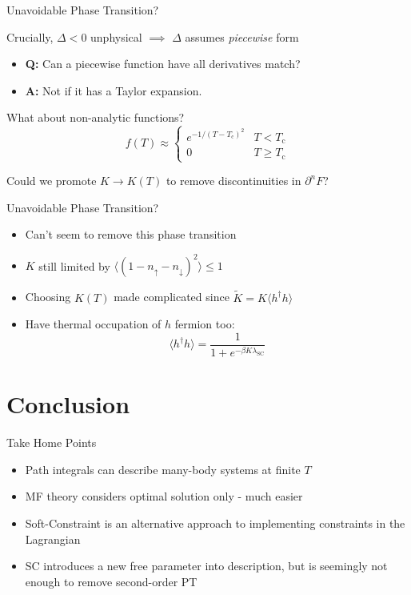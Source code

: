 \documentclass[13pt]{beamer}
\begin{document}
  \begin{frame}{Unavoidable Phase Transition?}

  Crucially, $ \Delta < 0 $ unphysical $ \implies $ $ \Delta $ assumes \emph{piecewise} form

    \begin{itemize}
      \item \textbf{Q:} Can a piecewise function have all derivatives match?
      \item \textbf{A:} Not if it has a Taylor expansion.
    \end{itemize}

  \begin{exampleblock}{What about non-analytic functions?}
    $$ f(T) \approx 
    \begin{cases}
    e^{- 1 / (T - T_{\text{c}})^2} & T < T_{\text{c}} \\
    0 & T \geq T_{\text{c}}
    \end{cases} $$
  \end{exampleblock}

  Could we promote $ K \rightarrow K(T) $ to remove discontinuities in $ \partial^n F $?

  \end{frame}

  \begin{frame}{Unavoidable Phase Transition?}
    \begin{itemize}
      \item Can't seem to remove this phase transition
      \item $ K $ still limited by $ \langle (1 - n_{\uparrow} - n_{\downarrow})^2 \rangle \leq 1 $
      \item Choosing $ K(T) $ made complicated since $ \widetilde{K} = K \langle h^{\dagger} h \rangle $
      \item Have thermal occupation of $ h $ fermion too: $$ \langle h^{\dagger} h \rangle = \frac{1}{1 + e^{- \beta K \lambda_{\text{SC}}}} $$
    \end{itemize}

  \end{frame}

  \section{Conclusion}

  \begin{frame}{Take Home Points}

  \begin{itemize}
    \item Path integrals can describe many-body systems at finite $ T $
    \item MF theory considers optimal solution only - much easier
    \item Soft-Constraint is an alternative approach to implementing constraints in the Lagrangian
    \item SC introduces a new free parameter into description, but is seemingly not enough to remove second-order PT
  \end{itemize}

  \end{frame}
\end{document}
